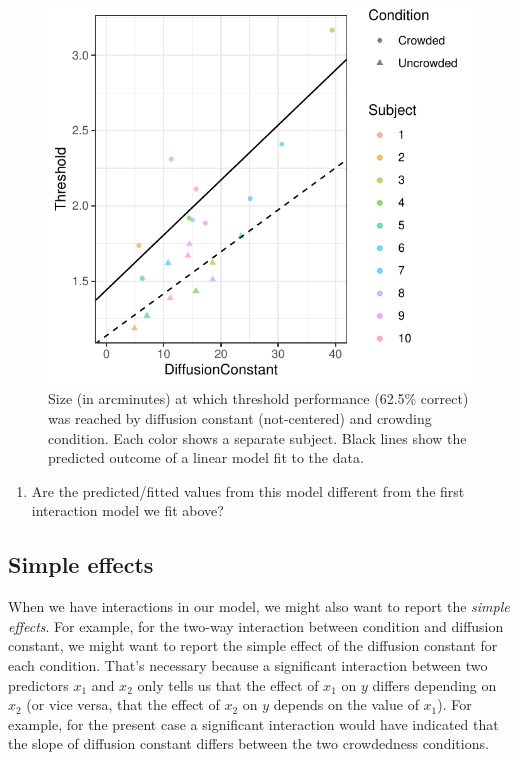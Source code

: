 \documentclass[
]{article}
\providecommand{\tightlist}{%
  \setlength{\itemsep}{0pt}\setlength{\parskip}{0pt}}
\begin{document}
\begin{figure}

{\centering \includegraphics{tutorial_files/figure-latex/unnamed-chunk-23-1} 

}

\caption{Size (in arcminutes) at which threshold performance (62.5\% correct) was reached by diffusion constant (not-centered) and crowding condition. Each color shows a separate subject. Black lines show the predicted outcome of a linear model fit to the data.}\label{fig:unnamed-chunk-23}
\end{figure}

\normalsize

\begin{enumerate}
\def\labelenumi{\arabic{enumi}.}
\tightlist
\item
  Are the predicted/fitted values from this model different from the
  first interaction model we fit above?
\end{enumerate}

\hypertarget{simple-effects}{%
\subsection{Simple effects}\label{simple-effects}}

When we have interactions in our model, we might also want to report the
\emph{simple effects}. For example, for the two-way interaction between
condition and diffusion constant, we might want to report the simple
effect of the diffusion constant for each condition. That's necessary
because a significant interaction between two predictors \(x_1\) and
\(x_2\) only tells us that the effect of \(x_1\) on \(y\) differs
depending on \(x_2\) (or vice versa, that the effect of \(x_2\) on \(y\)
depends on the value of \(x_1\)). For example, for the present case a
significant interaction would have indicated that the slope of diffusion
constant differs between the two crowdedness conditions.
\end{document}
